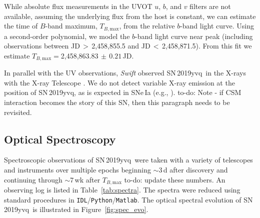 \documentclass[twocolumn]{aastex63}
\newcommand{\todo}[1]{{\color{magenta} to-do: {#1}}}
\newcommand{\tbmax}{$T_{B,\mathrm{max}}$}
\newcommand{\sn}{SN\,2019yvq}
\begin{document}
While absolute flux measurements in the UVOT $u$, $b$, and $v$ filters are
not available, assuming the underlying flux from the host is constant, we
can estimate the time of $B$-band maximum, \tbmax, from the relative
$b$-band light curve. Using a second-order polynomial, we model the $b$-band
light curve near peak (including observations between JD$\,> \,$2,458,855.5
and JD$\,<\,$2,458,871.5). From this fit we estimate \tbmax$ =
$2,458,863.83$ \,\pm \,0.21$\,JD.

In parallel with the UV observations, \textit{Swift} observed \sn\ in the
X-rays with the X-ray Telescope \citep{Burrows05}. We do not detect variable
X-ray emission at the position of \sn, as is expected in SNe\,Ia (e.g.,
\citealt{Margutti12}). \todo{Note - if CSM interaction becomes the story of
this SN, then this paragraph needs to be revisited.}

\subsection{Optical Spectroscopy}

Spectroscopic observations of \sn\ were taken with a variety of telescopes
and instruments over multiple epochs beginning $\sim$3\,d after discovery and
continuing through $\sim$7\,wk after \tbmax \todo{update these numbers}. An
observing log is listed in Table~\ref{tab:spectra}. The spectra were reduced
using standard procedures in \texttt{IDL}/\texttt{Python}/\texttt{Matlab}.
The optical spectral evolution of \sn\ is illustrated in
Figure~\ref{fig:spec_evo}.
\end{document}
